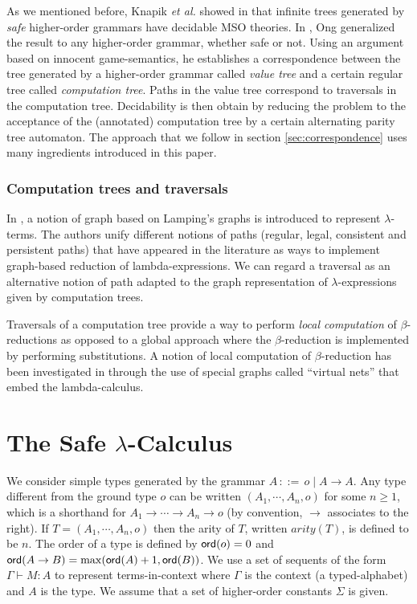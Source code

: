 \documentclass{llncs}
\newcommand\ord[1]{{\sf ord}(#1)}
\newcommand\typear{\rightarrow}
\begin{document}
As we mentioned before, Knapik \emph{et al.} showed in \cite{KNU02} that infinite trees generated by \emph{safe} higher-order grammars
have decidable MSO theories. In \cite{OngLics2006}, Ong generalized the result to any higher-order grammar, whether safe or not.
Using an argument based on innocent game-semantics, he establishes a correspondence between the tree generated by a higher-order grammar called
\emph{value tree} and a certain regular tree called \emph{computation tree}. Paths in the value tree correspond to traversals in the computation tree.
Decidability is then obtain by reducing the problem to the acceptance of the (annotated) computation tree by a certain alternating parity tree automaton.
The approach that we follow in section \ref{sec:correspondence} uses many ingredients introduced in this paper.


\subsubsection{Computation trees and traversals}

In \cite{DBLP:conf/lics/AspertiDLR94}, a notion of graph based on
Lamping's graphs \cite{lamping} is introduced to represent
$\lambda$-terms. The authors unify different notions of paths
(regular, legal, consistent and persistent paths) that have appeared
in the literature as ways to implement graph-based reduction of
lambda-expressions. We can regard a traversal as an alternative
notion of path adapted to the graph representation of
$\lambda$-expressions given by computation trees.

Traversals of a computation tree provide a way
to perform \emph{local computation} of $\beta$-reductions as opposed
to a global approach where the $\beta$-reduction is implemented by
performing substitutions. A notion of local computation of
$\beta$-reduction has been investigated in
\cite{DanosRegnier-Localandasynchronou} through the use of special
graphs called ``virtual nets'' that embed the lambda-calculus.


\section{The Safe $\lambda$-Calculus}
We consider simple types generated by the grammar $A
\, ::= \, o \; | \; A \typear A$. Any type different from the ground
type $o$ can be written $(A_1, \cdots, A_n, o)$ for some $n \geq 1$,
which is a shorthand for $A_1 \typear \cdots \typear A_n \typear o$ (by
convention, $\rightarrow$ associates to the right). If $T=(A_1,
\cdots, A_n, o)$ then the arity of $T$, written $arity(T)$, is
defined to be $n$.
The order of a type is defined by $\ord{o} = 0$ and
$\ord{A \typear B} = \max(\ord{A}+1, \ord{B})$.
We use a set of sequents of the form $\Gamma \vdash M : A$ to represent
terms-in-context where $\Gamma$ is the context (a typed-alphabet) and $A$ is the type. We assume that a set
of higher-order constants $\Sigma$ is given.
\end{document}
